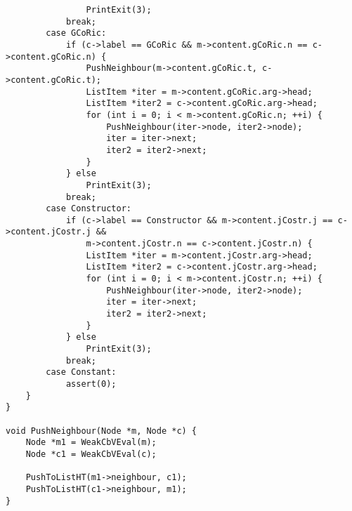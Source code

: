 \documentclass[12pt,a4paper,openright,twoside]{report}
\begin{document}
\begin{verbatim}
                PrintExit(3);
            break;
        case GCoRic:
            if (c->label == GCoRic && m->content.gCoRic.n == c->content.gCoRic.n) {
                PushNeighbour(m->content.gCoRic.t, c->content.gCoRic.t);
                ListItem *iter = m->content.gCoRic.arg->head;
                ListItem *iter2 = c->content.gCoRic.arg->head;
                for (int i = 0; i < m->content.gCoRic.n; ++i) {
                    PushNeighbour(iter->node, iter2->node);
                    iter = iter->next;
                    iter2 = iter2->next;
                }
            } else
                PrintExit(3);
            break;
        case Constructor:
            if (c->label == Constructor && m->content.jCostr.j == c->content.jCostr.j &&
                m->content.jCostr.n == c->content.jCostr.n) {
                ListItem *iter = m->content.jCostr.arg->head;
                ListItem *iter2 = c->content.jCostr.arg->head;
                for (int i = 0; i < m->content.jCostr.n; ++i) {
                    PushNeighbour(iter->node, iter2->node);
                    iter = iter->next;
                    iter2 = iter2->next;
                }
            } else
                PrintExit(3);
            break;
        case Constant:
            assert(0);
    }
}

void PushNeighbour(Node *m, Node *c) {
    Node *m1 = WeakCbVEval(m);
    Node *c1 = WeakCbVEval(c);

    PushToListHT(m1->neighbour, c1);
    PushToListHT(c1->neighbour, m1);
}



\end{verbatim}
\end{document}
